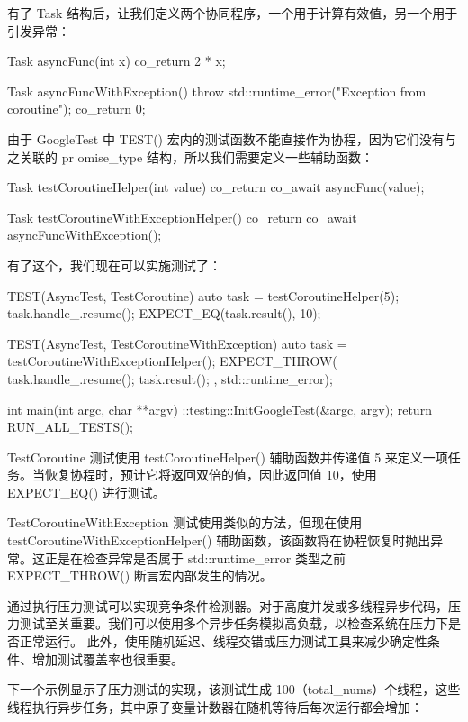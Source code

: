 有了 Task 结构后，让我们定义两个协同程序，一个用于计算有效值，另一个用于引发异常：

\begin{cpp}
Task asyncFunc(int x) {
    co_return 2 * x;
}

Task asyncFuncWithException() {
    throw std::runtime_error("Exception from coroutine");
    co_return 0;
}
\end{cpp}

由于 GoogleTest 中 TEST() 宏内的测试函数不能直接作为协程，因为它们没有与之关联的 pr omise\_type 结构，所以我们需要定义一些辅助函数：

\begin{cpp}
Task testCoroutineHelper(int value) {
    co_return co_await asyncFunc(value);
}

Task testCoroutineWithExceptionHelper() {
    co_return co_await asyncFuncWithException();
}
\end{cpp}

有了这个，我们现在可以实施测试了：

\begin{cpp}
TEST(AsyncTest, TestCoroutine) {
    auto task = testCoroutineHelper(5);
    task.handle_.resume();
    EXPECT_EQ(task.result(), 10);
}

TEST(AsyncTest, TestCoroutineWithException) {
    auto task = testCoroutineWithExceptionHelper();
    EXPECT_THROW({
            task.handle_.resume();
            task.result();
        },
        std::runtime_error);
}

int main(int argc, char **argv) {
    ::testing::InitGoogleTest(&argc, argv);
    return RUN_ALL_TESTS();
}
\end{cpp}

TestCoroutine 测试使用 testCoroutineHelper() 辅助函数并传递值 5 来定义一项任务。当恢复协程时，预计它将返回双倍的值，因此返回值 10，使用 EXPECT\_EQ() 进行测试。

TestCoroutineWithException 测试使用类似的方法，但现在使用 testCoroutineWithExceptionHelper() 辅助函数，该函数将在协程恢复时抛出异常。这正是在检查异常是否属于 std::runtime\_error 类型之前 EXPECT\_THROW() 断言宏内部发生的情况。


通过执行压力测试可以实现竞争条件检测器。对于高度并发或多线程异步代码，压力测试至关重要。我们可以使用多个异步任务模拟高负载，以检查系统在压力下是否正常运行。
此外，使用随机延迟、线程交错或压力测试工具来减少确定性条件、增加测试覆盖率也很重要。

下一个示例显示了压力测试的实现，该测试生成 100（total\_nums）个线程，这些线程执行异步任务，其中原子变量计数器在随机等待后每次运行都会增加：

